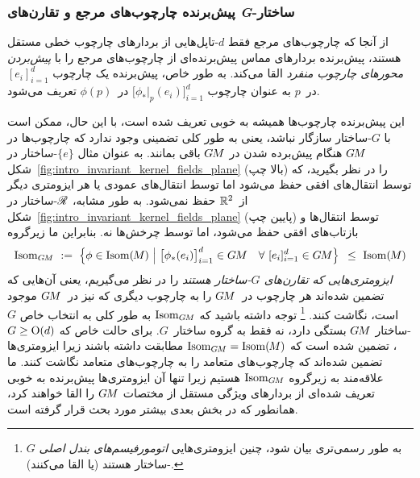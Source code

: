 \subsubsection{پیش‌برنده چارچوب‌های مرجع و تقارن‌های \textit{G}-ساختار}

از آنجا که چارچوب‌های مرجع فقط $d$-تاپل‌هایی از بردارهای چارچوب خطی مستقل هستند، پیش‌برنده بردارهای مماس پیش‌برنده‌ای از چارچوب‌های مرجع را با \emph{پیش‌بردن محورهای چارچوب منفرد} القا می‌کند.
به طور خاص، پیش‌برنده یک چارچوب $[e_i]_{i=1}^d$ در~$p$ به عنوان چارچوب $\big[ \phi_*|_p (e_i) \big]_{i=1}^d$ در~$\phi(p)$ تعریف می‌شود.


این پیش‌برنده چارچوب‌ها همیشه به خوبی تعریف شده است، با این حال، ممکن است با $G$-ساختار سازگار نباشد، یعنی به طور کلی تضمینی وجود ندارد که چارچوب‌ها در $G\mkern-1.4muM$ هنگام پیش‌برده شدن در $G\mkern-1.4muM$ باقی بمانند.
به عنوان مثال $\{e\}$-ساختار در شکل~\ref{fig:intro_invariant_kernel_fields_plane} (بالا چپ) را در نظر بگیرید، که توسط انتقال‌های افقی حفظ می‌شود اما توسط انتقال‌های عمودی یا هر ایزومتری دیگر از~$\mathbb{R}^2$ حفظ نمی‌شود.
به طور مشابه، $\mathscr{R}$-ساختار در شکل~\ref{fig:intro_invariant_kernel_fields_plane} (پایین چپ) توسط انتقال‌ها و بازتاب‌های افقی حفظ می‌شود، اما توسط چرخش‌ها نه.
بنابراین ما زیرگروه
\begin{align}\label{eq:IsomGM_def_24}
	\IsomGM\ :=\ \pig\{ \phi \in \IsomM \ \pig|\ 
	\big[\phi_*(e_i)\big]_{i=1}^d \in \GM \quad \forall\ [e_i]_{i=1}^d \in \GM \pig\} \,\ \leq\ \IsomM
\end{align}
\emph{ایزومتری‌هایی که تقارن‌های $G$-ساختار هستند} را در نظر می‌گیریم، یعنی آن‌هایی که تضمین شده‌اند هر چارچوب در~$G\mkern-1.4muM$ را به چارچوب دیگری که نیز در~$G\mkern-1.4muM$ موجود است، نگاشت کنند.%
\footnote{
	به طور رسمی‌تری بیان شود، چنین ایزومتری‌هایی \emph{اتومورفیسم‌های بندل اصلی} $G$-ساختار هستند (یا القا می‌کنند).
}
توجه داشته باشید که $\operatorname{Isom}_{G\mkern-1.4muM}$ به طور کلی به انتخاب خاص $G$-ساختار $G\mkern-1.4muM$ بستگی دارد، نه فقط به گروه ساختار~$G$.
برای حالت خاص که $G\geq\operatorname{O}(d)$، تضمین شده است که $\operatorname{Isom}_{G\mkern-1.4muM}=\operatorname{Isom}(\mkern-1.5mu M \mkern-.5mu)$ مطابقت داشته باشند زیرا ایزومتری‌ها تضمین شده‌اند که چارچوب‌های متعامد را به چارچوب‌های متعامد نگاشت کنند.
ما علاقه‌مند به زیرگروه $\operatorname{Isom}_{G\mkern-1.4muM}$ هستیم زیرا تنها آن ایزومتری‌ها پیش‌برنده به خوبی تعریف شده‌ای از بردارهای ویژگی مستقل از مختصات $G\mkern-1.4muM$ را القا خواهند کرد، همانطور که در بخش بعدی بیشتر مورد بحث قرار گرفته است.


